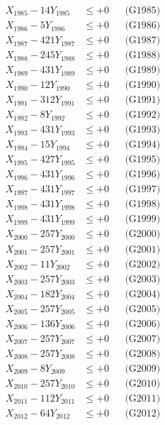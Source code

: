 \documentclass[a4paper,10pt]{article}
\begin{document}
{\begin{align}
X_{1985} - 14Y_{1985} &\leq +0 && \text{(G1985)} \\
X_{1986} - 5Y_{1986} &\leq +0 && \text{(G1986)} \\
X_{1987} - 421Y_{1987} &\leq +0 && \text{(G1987)} \\
X_{1988} - 245Y_{1988} &\leq +0 && \text{(G1988)} \\
X_{1989} - 431Y_{1989} &\leq +0 && \text{(G1989)} \\
X_{1990} - 12Y_{1990} &\leq +0 && \text{(G1990)} \\
\allowbreak
X_{1991} - 312Y_{1991} &\leq +0 && \text{(G1991)} \\
X_{1992} - 8Y_{1992} &\leq +0 && \text{(G1992)} \\
X_{1993} - 431Y_{1993} &\leq +0 && \text{(G1993)} \\
X_{1994} - 15Y_{1994} &\leq +0 && \text{(G1994)} \\
X_{1995} - 427Y_{1995} &\leq +0 && \text{(G1995)} \\
X_{1996} - 431Y_{1996} &\leq +0 && \text{(G1996)} \\
X_{1997} - 431Y_{1997} &\leq +0 && \text{(G1997)} \\
X_{1998} - 431Y_{1998} &\leq +0 && \text{(G1998)} \\
X_{1999} - 431Y_{1999} &\leq +0 && \text{(G1999)} \\
X_{2000} - 257Y_{2000} &\leq +0 && \text{(G2000)} \\
\allowbreak
X_{2001} - 257Y_{2001} &\leq +0 && \text{(G2001)} \\
X_{2002} - 11Y_{2002} &\leq +0 && \text{(G2002)} \\
X_{2003} - 257Y_{2003} &\leq +0 && \text{(G2003)} \\
X_{2004} - 182Y_{2004} &\leq +0 && \text{(G2004)} \\
X_{2005} - 257Y_{2005} &\leq +0 && \text{(G2005)} \\
X_{2006} - 136Y_{2006} &\leq +0 && \text{(G2006)} \\
X_{2007} - 257Y_{2007} &\leq +0 && \text{(G2007)} \\
X_{2008} - 257Y_{2008} &\leq +0 && \text{(G2008)} \\
X_{2009} - 8Y_{2009} &\leq +0 && \text{(G2009)} \\
X_{2010} - 257Y_{2010} &\leq +0 && \text{(G2010)} \\
\allowbreak
X_{2011} - 112Y_{2011} &\leq +0 && \text{(G2011)} \\
X_{2012} - 64Y_{2012} &\leq +0 && \text{(G2012)} \\

\end{align}}
\end{document}
